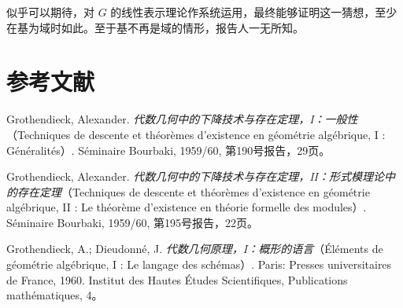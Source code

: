 似乎可以期待，对 $G$ 的线性表示理论作系统运用，最终能够证明这一猜想，至少在基为域时如此。至于基不再是域的情形，报告人一无所知。

\section*{参考文献}
\begin{enumerate}[label={[\arabic*]}]
 \item Grothendieck, Alexander. \emph{代数几何中的下降技术与存在定理，I：一般性}（Techniques de descente et théorèmes d'existence en géométrie algébrique, I : Généralités）. Séminaire Bourbaki, 1959/60, 第190号报告，29页。
 \item Grothendieck, Alexander. \emph{代数几何中的下降技术与存在定理，II：形式模理论中的存在定理}（Techniques de descente et théorèmes d'existence en géométrie algébrique, II : Le théorème d'existence en théorie formelle des modules）. Séminaire Bourbaki, 1959/60, 第195号报告，22页。
 \item Grothendieck, A.; Dieudonné, J. \emph{代数几何原理，I：概形的语言}（Éléments de géométrie algébrique, I : Le langage des schémas）. Paris: Presses universitaires de France, 1960. Institut des Hautes Études Scientifiques, Publications mathématiques, 4。
\end{enumerate}

